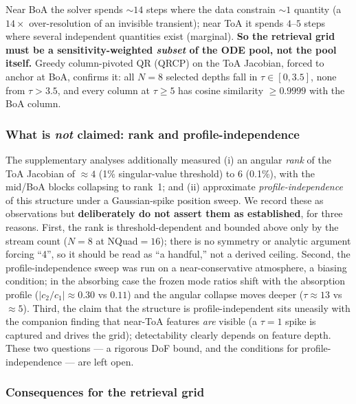 \documentclass[11pt,a4paper]{article}
\theoremstyle{definition}
\begin{document}
Near BoA the solver spends ${\sim}14$ steps where the data constrain
${\sim}1$ quantity (a $14\times$ over-resolution of an invisible
transient); near ToA it spends $4$--$5$ steps where several independent
quantities exist (marginal).  \textbf{So the retrieval grid must be a
sensitivity-weighted \emph{subset} of the ODE pool, not the pool
itself.}  Greedy column-pivoted QR (QRCP) on the ToA Jacobian, forced to
anchor at BoA, confirms it: all $N=8$ selected depths fall in
$\tau\in[0,3.5]$, none from $\tau>3.5$, and every column at $\tau\geq5$
has cosine similarity $\geq0.9999$ with the BoA column.

\subsubsection{What is \emph{not} claimed: rank and profile-independence}

The supplementary analyses additionally measured (i) an angular
\emph{rank} of the ToA Jacobian of ${\approx}4$ (1\% singular-value
threshold) to $6$ (0.1\%), with the mid/BoA blocks collapsing to rank~1;
and (ii) approximate \emph{profile-independence} of this structure under
a Gaussian-spike position sweep.  We record these as observations but
\textbf{deliberately do not assert them as established}, for three
reasons.  First, the rank is threshold-dependent and bounded above only
by the stream count ($N=8$ at NQuad${}=16$); there is no symmetry or
analytic argument forcing ``4'', so it should be read as ``a handful,''
not a derived ceiling.  Second, the profile-independence sweep was run on
a near-conservative atmosphere, a biasing condition; in the absorbing
case the frozen mode ratios shift with the absorption profile
($|c_2/c_1|\approx0.30$ vs $0.11$) and the angular collapse moves deeper
($\tau\approx13$ vs $\approx5$).  Third, the claim that the structure is
profile-independent sits uneasily with the companion finding that
near-ToA features \emph{are} visible (a $\tau{=}1$ spike is captured and
drives the grid); detectability clearly depends on feature depth.  These
two questions --- a rigorous DoF bound, and the conditions for
profile-independence --- are left open.

\subsubsection{Consequences for the retrieval grid}
\end{document}
